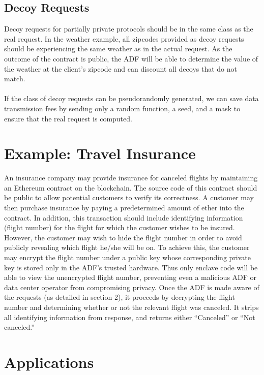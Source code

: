 \documentclass[letterpaper,twocolumn,10pt]{article}
\begin{document}
\subsection{Decoy Requests}
Decoy requests for partially private protocols should be in the same class as the real request.  In the weather example, all zipcodes provided as decoy requests should be experiencing the same weather as in the actual request.  As the outcome of the contract is public, the ADF will be able to determine the value of the weather at the client's zipcode and can discount all decoys that do not match.\\\\
If the class of decoy requests can be pseudorandomly generated, we can save data transmission fees by sending only a random function, a seed, and a mask to ensure that the real request is computed.

\section{Example: Travel Insurance}
An insurance company may provide insurance for canceled flights by maintaining an Ethereum contract on the blockchain.  The source code of this contract should be public to allow potential customers to verify its correctness.  A customer may then purchase insurance by paying a predetermined amount of ether into the contract.  In addition, this transaction should include identifying information (flight number) for the flight for which the customer wishes to be insured.  However, the customer may wish to hide the flight number in order to avoid publicly revealing which flight he/she will be on.  To achieve this, the customer may encrypt the flight number under a public key whose corresponding private key is stored only in the ADF's trusted hardware.  Thus only enclave code will be able to view the unencrypted flight number, preventing even a malicious ADF or data center operator from compromising privacy. Once the ADF is made aware of the requests (as detailed in section 2), it proceeds by decrypting the flight number and determining whether or not the relevant flight was canceled. It strips all identifying information from response, and returns either ``Canceled'' or ``Not canceled.''  

\section{Applications}
\end{document}
